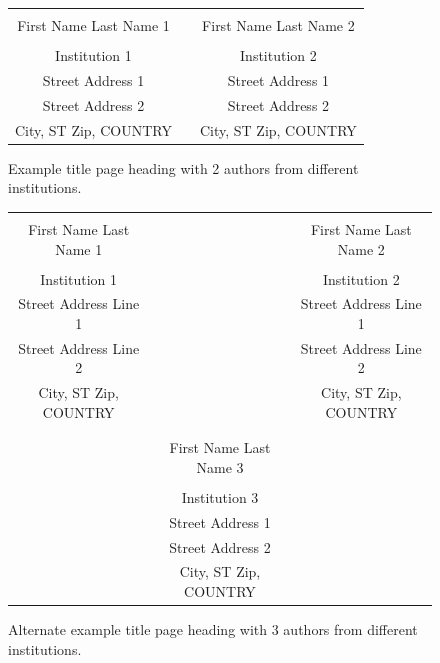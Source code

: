 \documentclass{wscpaperproc}
\theoremstyle{wsc}
\begin{document}
\begin{figure}[htb]
{
\centering
\begin{tabular}{ccc}
\phantom{Entries to adjust spacing - ignore} & \phantom{intermediate space} & \phantom{Entries to adjust spacing - ignore} \\
First Name Last Name 1 & & First Name Last Name 2 \\
\\
Institution 1 & & Institution 2 \\
Street Address 1 & & Street Address 1 \\
Street Address 2 & & Street Address 2 \\
City, ST Zip, COUNTRY & & City, ST Zip, COUNTRY
\end{tabular}
\caption{Example title page heading with 2 authors from different institutions.\label{fig: 2 different}}
}
\end{figure}



\begin{figure}[htb]
{
\centering
\begin{tabular}{ccc}
\phantom{This adjusts spacing - ignore} & \phantom{This adjusts spacing - ignore} & \phantom{This adjusts spacing - ignore} \\
First Name Last Name 1 & & First Name Last Name 2 \\
\\
Institution 1 & & Institution 2 \\
Street Address Line 1 & & Street Address Line 1 \\
Street Address Line 2 & & Street Address Line 2 \\
City, ST Zip, COUNTRY & & City, ST Zip, COUNTRY \\
\\
\\
& First Name Last Name 3 \\
\\
& Institution 3\\
& Street Address 1 \\
& Street Address 2 \\
& City, ST Zip, COUNTRY
\end{tabular}
\caption{Alternate example title page heading with 3 authors from different institutions. \label{fig: 3 different}}
}
\end{figure}
\end{document}
